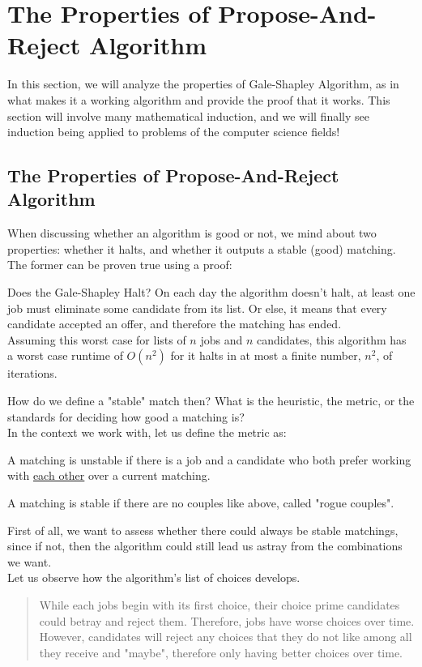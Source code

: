 \section{The Properties of Propose-And-Reject Algorithm}
In this section, we will analyze the properties of Gale-Shapley Algorithm, as in what makes it a working algorithm and provide the proof that it works. This section will involve many mathematical induction, and we will finally see induction being applied to problems of the computer science fields!

\subsection{The Properties of Propose-And-Reject Algorithm}
When discussing whether an algorithm is good or not, we mind about two properties: whether it halts, and whether it outputs a stable (good) matching. \\
The former can be proven true using a proof:
\begin{ln-think}{Does the Gale-Shapley Halt?}{}
    On each day the algorithm doesn't halt, at least one job must eliminate some candidate from its list. Or else, it means that every candidate accepted an offer, and therefore the matching has ended. \\
    Assuming this worst case for lists of $n$ jobs and $n$ candidates, this algorithm has a worst case runtime of $O(n ^ 2)$ for it halts in at most a finite number, $n ^ 2$, of iterations.
\end{ln-think}
How do we define a "stable" match then? What is the heuristic, the metric, or the standards for deciding how good a matching is? \\
In the context we work with, let us define the metric as:
\begin{bindenum}
    \item A matching is unstable if there is a job and a candidate who both prefer working with \underline{each other} over a current matching.
    \item A matching is stable if there are no couples like above, called "rogue couples".
\end{bindenum}
First of all, we want to assess whether there could always be stable matchings, since if not, then the algorithm could still lead us astray from the combinations we want. \\
Let us observe how the algorithm's list of choices develops. \\
\begin{quote}
    While each jobs begin with its first choice, their choice prime candidates could betray and reject them. Therefore, jobs have worse choices over time. However, candidates will reject any choices that they do not like among all they receive and "maybe", therefore only having better choices over time. \\
\end{quote}
